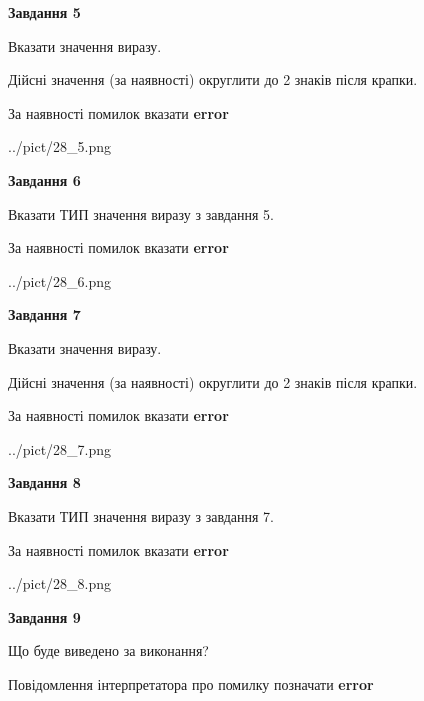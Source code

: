 \documentclass[11pt, ukrainian]{article}
\begin{document}
{\begin {large}
{\begin {center}\textbf{Завдання 5}\end {center}}\par
Вказати значення виразу. \par
Дійсні значення (за наявності) округлити до 2 знаків після крапки. \par
За наявності помилок вказати \textbf{error}

\begin{center}
	{../pict/28_5.png}
\end{center}
\newpage

{\begin {center}\textbf{Завдання 6}\end {center}}\par
Вказати ТИП значення виразу з завдання 5. \par
За наявності помилок вказати \textbf{error}

\begin{center}
	{../pict/28_6.png}
\end{center}
\newpage

{\begin {center}\textbf{Завдання 7}\end {center}}\par
Вказати значення виразу. \par
Дійсні значення (за наявності) округлити до 2 знаків після крапки. \par
За наявності помилок вказати \textbf{error}

\begin{center}
	{../pict/28_7.png}
\end{center}
\newpage

{\begin {center}\textbf{Завдання 8}\end {center}}\par
Вказати ТИП значення виразу з завдання 7. \par
За наявності помилок вказати \textbf{error}

\begin{center}
	{../pict/28_8.png}
\end{center}
\newpage

{\begin {center}\textbf{Завдання 9}\end {center}}\par
Що буде виведено за виконання? \par
Повідомлення інтерпретатора про помилку позначати \textbf{error}


\end{large}}
\end{document}
